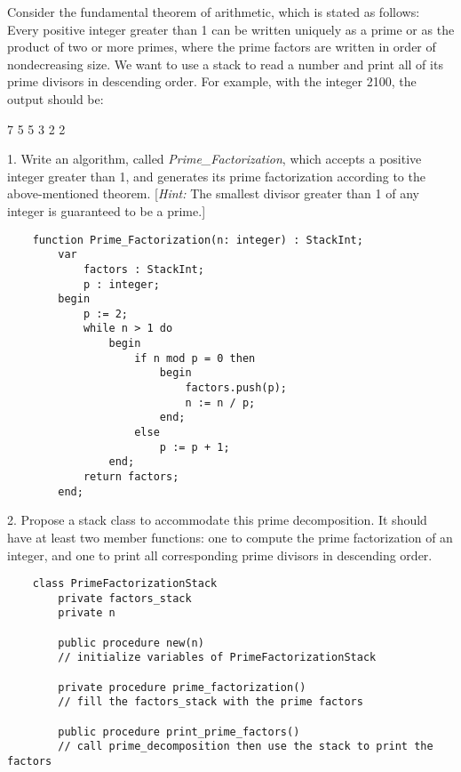 \documentclass[12pt]{article}
\newenvironment{problem}[2][Problem]{\begin{trivlist}
\item[\hskip \labelsep {\bfseries #1}\hskip \labelsep {\bfseries #2.}]}{\end{trivlist}}
\begin{document}
\begin{problem}{2 (Stacks)}
    Consider the fundamental theorem of arithmetic, which is stated as follows: 
    Every positive integer greater than 1 can be written uniquely as a prime or as the product of two or more primes,
    where the prime factors are written in order of nondecreasing size. 
    We want to use a stack to read a number and print all of its prime divisors in descending order.
    For example, with the integer 2100, the output should be:\\
    \begin{center}
        7 5 5 3 2 2
    \end{center}

    1. Write an algorithm, called \emph{Prime\_Factorization}, which accepts a positive integer greater than 1,
    and generates its prime factorization according to the above-mentioned theorem. [\emph{Hint:} The smallest divisor greater than 1 of any integer is guaranteed to be a prime.]
\begin{verbatim}
    function Prime_Factorization(n: integer) : StackInt;
        var
            factors : StackInt;
            p : integer;
        begin
            p := 2;
            while n > 1 do
                begin
                    if n mod p = 0 then
                        begin
                            factors.push(p);
                            n := n / p;
                        end;
                    else
                        p := p + 1;
                end;
            return factors;
        end;
\end{verbatim}

    2. Propose a stack class to accommodate this prime decomposition.
    It should have at least two member functions: one to compute the prime factorization
    of an integer, and one to print all corresponding prime divisors in descending order.
\begin{verbatim}
    class PrimeFactorizationStack
        private factors_stack
        private n

        public procedure new(n)
        // initialize variables of PrimeFactorizationStack

        private procedure prime_factorization()
        // fill the factors_stack with the prime factors

        public procedure print_prime_factors()
        // call prime_decomposition then use the stack to print the factors
\end{verbatim}


\end{problem}
\end{document}
